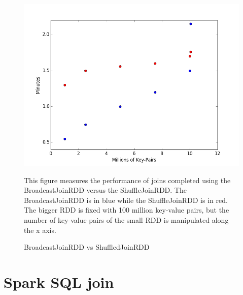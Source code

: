 \begin{figure}[h]
\begin{center}
\includegraphics[scale=0.6]{./img/rddjoin.png}
\caption{BroadcastJoinRDD vs ShuffledJoinRDD}
\label{fig:rddjoin}
\end{center}
This figure measures the performance of joins completed using the BroadcastJoinRDD versus the ShuffleJoinRDD.
The BroadcastJoinRDD is in blue while the ShuffleJoinRDD is in red. The bigger RDD is fixed with 100 million key-value pairs, but the 
number of key-value pairs of the small RDD is manipulated along the x axis.
\end{figure}

\section{Spark SQL join}
